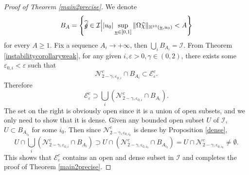 \documentclass[11pt,reqno]{amsart}
\theoremstyle{definition}
\numberwithin{equation}{section}
\renewcommand{\H}{\mathbb{H}}
\def\chih{\widehat{\chi}}
\def\ub{\underline{u}}
\def\gs{\mbox{$g \mkern -9mu /$}}
\begin{document}
\begin{proof}[Proof of Theorem \ref{main2precise}]
We denote 
$$B_A=\left\{\widehat{\gs}\in\mathcal{I}\Big||u_0|\sup_{\ub\in[0,1]}\|\Omega\chih\|_{\H^{10}(\ub,u_0)}< A\right\}$$
for every $A\ge 1$. Fix a sequence $A_i\to+\infty$, then $\bigcup_i B_{A_i}=\mathcal{I}$. From Theorem \ref{instabilitycorollaryweak}, for any given $i, \varepsilon>0,\gamma\in(0,2)$, there exists some $\varepsilon_{0,i}<\varepsilon$ such that
$$\mathcal{N}^c_{2-\gamma,\varepsilon_{0,i}}\cap B_{A_i}\subset\mathcal{E}^c_{\varepsilon}.$$
Therefore
$$\mathcal{E}^c_\varepsilon\supset\bigcup_i(\mathcal{N}^c_{2-\gamma,\varepsilon_{0,i}}\cap B_{A_i}).$$
The set on the right is obviously open since it is a union of open subsets, and we only need to show that it is dense. Given any bounded open subset $U$ of $\mathcal{I}$, $U\subset B_{A_{i_0}}$ for some $i_0$. Then since $\mathcal{N}^c_{2-\gamma,\varepsilon_{0,i_0}}$ is dense by Proposition \ref{dense},
$$U\cap \bigcup_i(\mathcal{N}^c_{2-\gamma,\varepsilon_{0,i}}\cap B_{A_i})\supset U\cap(\mathcal{N}^c_{2-\gamma,\varepsilon_{0,{i_0}}}\cap B_{A_{i_0}})=U\cap \mathcal{N}^c_{2-\gamma,\varepsilon_{0,{i_0}}}\ne\emptyset.$$
This shows that $\mathcal{E}^c_\varepsilon$ contains an open and dense subset in $\mathcal{I}$ and completes the proof of Theorem \ref{main2precise}.

\end{proof}
\end{document}
